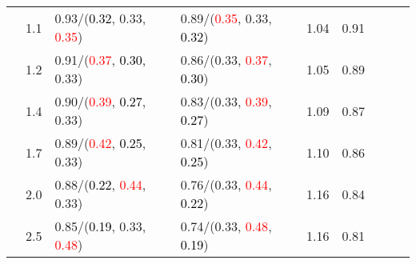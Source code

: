 \documentclass[10pt,a4paper]{report}
\begin{document}
\begin{table}[!htbp]
\begin{center}
{\begin{tabular}{ccllccccc}
				  & 1.1                               & 0.93/(\textcolor{black}{0.32}, 0.33, \textcolor{red}{0.35})                                                                                                                                   & 0.89/(\textcolor{red}{0.35}, 0.33, \textcolor{black}{0.32})                                                                                                                                   & 1.04             & 0.91                     \\
				  & 1.2                               & 0.91/(\textcolor{red}{0.37}, \textcolor{black}{0.30}, 0.33)                                                                                                                                   & 0.86/(0.33, \textcolor{red}{0.37}, \textcolor{black}{0.30})                                                                                                                                   & 1.05             & 0.89                     \\
				  & 1.4                               & 0.90/(\textcolor{red}{0.39}, \textcolor{black}{0.27}, 0.33)                                                                                                                                   & 0.83/(0.33, \textcolor{red}{0.39}, \textcolor{black}{0.27})                                                                                                                                   & 1.09             & 0.87                     \\
				  & 1.7                               & 0.89/(\textcolor{red}{0.42}, \textcolor{black}{0.25}, 0.33)                                                                                                                                   & 0.81/(0.33, \textcolor{red}{0.42}, \textcolor{black}{0.25})                                                                                                                                   & 1.10             & 0.86                     \\
				  & 2.0                               & 0.88/(\textcolor{black}{0.22}, \textcolor{red}{0.44}, 0.33)                                                                                                                                   & 0.76/(0.33, \textcolor{red}{0.44}, \textcolor{black}{0.22})                                                                                                                                   & 1.16             & 0.84                     \\
				  & 2.5                               & 0.85/(\textcolor{black}{0.19}, 0.33, \textcolor{red}{0.48})                                                                                                                                   & 0.74/(0.33, \textcolor{red}{0.48}, \textcolor{black}{0.19})                                                                                                                                   & 1.16             & 0.81                     \\

\end{tabular}}
\end{center}
\end{table}
\end{document}

